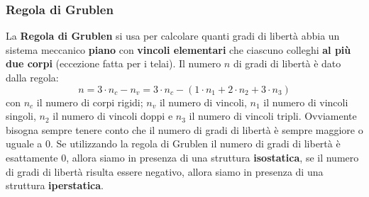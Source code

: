 \subsubsection{Regola di Grublen}
La \textbf{Regola di Grublen} si usa per calcolare quanti gradi di libertà abbia un sistema meccanico \textbf{piano} con \textbf{vincoli elementari} che ciascuno colleghi \textbf{al più due corpi} (eccezione fatta per i telai).\newline
\newline
Il numero $n$ di gradi di libertà è dato dalla regola:
\[
    n = 3 \cdot n_c - n_v = 3 \cdot n_c - (1 \cdot n_1 + 2 \cdot n_2 + 3 \cdot n_3)
\]
con $n_c$ il numero di corpi rigidi; $n_v$ il numero di vincoli, $n_1$ il numero di vincoli singoli, $n_2$ il numero di vincoli doppi e $n_3$ il numero di vincoli tripli.\newline
\newline
Ovviamente bisogna sempre tenere conto che il numero di gradi di libertà è sempre maggiore o uguale a $0$.\newline
\newline
Se utilizzando la regola di Grublen il numero di gradi di libertà è esattamente $0$, allora siamo in presenza di una struttura \textbf{isostatica}, se il numero di gradi di libertà risulta essere negativo, allora siamo in presenza di una struttura \textbf{iperstatica}.\newline
\newline
